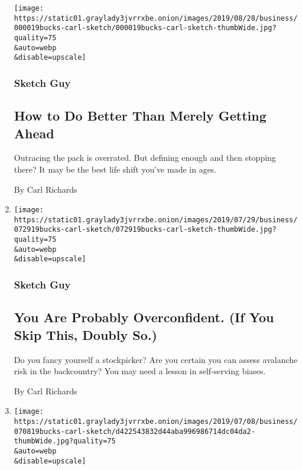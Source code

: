 \begin{enumerate}
  \texttt{[image: https://static01.graylady3jvrrxbe.onion/images/2019/08/28/business/000019bucks-carl-sketch/000019bucks-carl-sketch-thumbWide.jpg?quality=75\\\&auto=webp\\\&disable=upscale]}

  \hypertarget{sketch-guy-2}{%
  \subsubsection{Sketch Guy}\label{sketch-guy-2}}

  \hypertarget{how-to-do-better-than-merely-getting-ahead}{%
  \subsection{How to Do Better Than Merely Getting
  Ahead}\label{how-to-do-better-than-merely-getting-ahead}}

  Outracing the pack is overrated. But defining enough and then stopping
  there? It may be the best life shift you've made in ages.

  By Carl Richards
\item
  \href{/2019/07/29/business/confidence-bias-investing.html}{}

  \texttt{[image: https://static01.graylady3jvrrxbe.onion/images/2019/07/29/business/072919bucks-carl-sketch/072919bucks-carl-sketch-thumbWide.jpg?quality=75\\\&auto=webp\\\&disable=upscale]}

  \hypertarget{sketch-guy-3}{%
  \subsubsection{Sketch Guy}\label{sketch-guy-3}}

  \hypertarget{you-are-probably-overconfident-if-you-skip-this-doubly-so}{%
  \subsection{You Are Probably Overconfident. (If You Skip This, Doubly
  So.)}\label{you-are-probably-overconfident-if-you-skip-this-doubly-so}}

  Do you fancy yourself a stockpicker? Are you certain you can assess
  avalanche risk in the backcountry? You may need a lesson in
  self-serving biases.

  By Carl Richards
\item
  \href{/2019/07/08/your-money/sketch-guy-your-own-way.html}{}

  \texttt{[image: https://static01.graylady3jvrrxbe.onion/images/2019/07/08/business/070819bucks-carl-sketch/d422543832d44aba996986714dc04da2-thumbWide.jpg?quality=75\\\&auto=webp\\\&disable=upscale]}


\end{enumerate}
